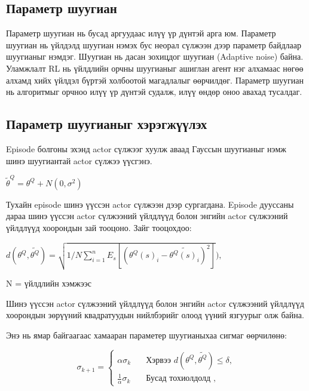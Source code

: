 \documentclass[12pt,A4]{report}
\begin{document}
\subsection{Параметр шуугиан}
 
Параметр шуугиан нь бусад аргуудаас илүү үр дүнтэй арга юм. Параметр шуугиан нь үйлдэлд шуугиан нэмэх бус неорал сүлжээн дээр параметр байдлаар шуугианыг нэмдэг. Шуугиан нь дасан зохицдог шуугиан (Adaptive noise) байна. Уламжлалт RL нь үйлдлийн орчны шуугианыг ашиглан агент нэг алхамаас нөгөө алхамд хийх үйлдэл бүртэй холбоотой магадлалыг өөрчилдөг. Параметр шуугиан нь алгоритмыг орчноо илүү үр дүнтэй судалж, илүү өндөр оноо авахад тусалдаг.

\subsection{Параметр шуугианыг хэрэгжүүлэх}

Episode болгоны эхэнд actor сүлжээг хуулж аваад Гауссын шуугианыг нэмж шинэ шуугиантай actor сүлжээ үүсгэнэ.

\begin{center}
$\tilde{\theta}^Q=\theta^Q+N(0, \sigma^2)$
\end{center}

Тухайн episode шинэ үүссэн actor сүлжээн дээр сургагдана. Episode дууссаны дараа шинэ үүссэн actor сүлжээний үйлдлүүд болон энгийн actor сүлжээний үйлдлүүд хоорондын зай тооцоно. Зайг тооцохдоо:

\begin{center}

$d(\theta^Q, \tilde{\theta^Q})=\sqrt{1/N\sum_{i=1}^{n}E_s[(\theta^Q(s)_i-\tilde{\theta^Q(s)_i})^2]}),$

\end{center}

N = үйлдлийн хэмжээс

Шинэ үүссэн actor сүлжээний үйлдлүүд болон энгийн actor сүлжээний үйлдлүүд хоорондын зөрүүний квадратуудын нийлбэрийг олоод үүний язгуурыг олж байна.

Энэ нь ямар байгаагаас хамааран параметер шуугианыхаа сигмаг өөрчилөнө:

\begin{center}
\[ \sigma_{k+1} =
  \begin{cases}
    \alpha\sigma_k       & \quad \text{Хэрвээ } d(\theta^Q, \tilde{\theta^Q})\leq\delta,\\
    \frac{1}{\alpha}\sigma_k  & \quad \text{Бусад тохиолдолд },
  \end{cases}
\]
\end{center}
\end{document}

